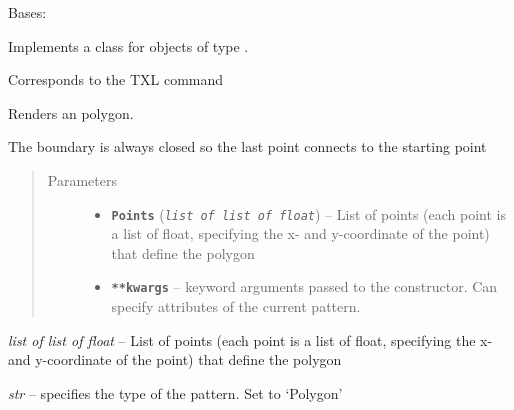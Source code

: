 \documentclass[letterpaper,10pt,english]{sphinxmanual}
\begin{document}
\begin{fulllineitems}
\label{Chapters/PythonModuleReference/Patterns/TXLWizard.Patterns.Polygon:TXLWizard.Patterns.Polygon.Polygon}
Bases: {\hyperref[Chapters/PythonModuleReference/Patterns/TXLWizard.Patterns.AbstractPattern:TXLWizard.Patterns.AbstractPattern.AbstractPattern]{}}

Implements a class for  objects of type .

Corresponds to the TXL command 

Renders an polygon.

The boundary is always closed so the last point connects to the starting point
\begin{quote}\begin{description}
\item[{Parameters}] \leavevmode\begin{itemize}
\item {} 
\textbf{\texttt{Points}} (\emph{\texttt{list of list of float}}) -- List of points (each point is a list of float, specifying the x- and y-coordinate of the point) that define the polygon

\item {} 
\textbf{\texttt{**kwargs}} -- keyword arguments passed to the {\hyperref[Chapters/PythonModuleReference/Patterns/TXLWizard.Patterns.AbstractPattern:TXLWizard.Patterns.AbstractPattern.AbstractPattern]{}} constructor.
Can specify attributes of the current pattern.

\end{itemize}

\end{description}\end{quote}

\begin{fulllineitems}
\label{Chapters/PythonModuleReference/Patterns/TXLWizard.Patterns.Polygon:TXLWizard.Patterns.Polygon.Polygon.Points}
\emph{list of list of float} -- List of points (each point is a list of float, specifying the x- and y-coordinate of the point) that define the polygon

\end{fulllineitems}


\begin{fulllineitems}
\label{Chapters/PythonModuleReference/Patterns/TXLWizard.Patterns.Polygon:TXLWizard.Patterns.Polygon.Polygon.Type}
\emph{str} -- specifies the type of the pattern. Set to `Polygon'

\end{fulllineitems}


\end{fulllineitems}
\end{document}
